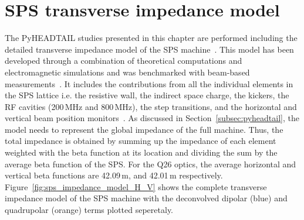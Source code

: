 \section{SPS transverse impedance model}\label{sec:sps_impedance_model}
The PyHEADTAIL studies presented in this chapter are performed including the detailed transverse impedance model of the SPS machine~\cite{sps_impedance_model_git}. This model has been developed through a combination of theoretical computations and electromagnetic simulations and was benchmarked with beam-based measurements~\cite{Salvant:1274254, Zannini:1561199, Salvant:1271349, Zannini:2141779}. 
It includes the contributions from all the individual elements in the SPS lattice i.e. the resistive wall, the indirect space charge, the kickers, the RF cavities (200\,MHz and 800\,MHz), the step transitions, and the horizontal and vertical beam position monitors~\cite{Zannini:2141779}. As discussed in  Section~\ref{subsec:pyheadtail}, the model needs to represent the global impedance of the full machine. Thus, the total impedance is obtained by summing up the impedance of each element weighted with the beta function at its location and dividing the sum by the average beta function of the SPS. For the Q26 optics, the average horizontal and vertical beta functions are 42.09\,m, and 42.01\,m respectively.
Figure~\ref{fig:sps_impedance_model_H_V} shows the complete transverse impedance model of the SPS machine with the deconvolved dipolar (blue) and quadrupolar (orange) terms plotted seperetaly. 

